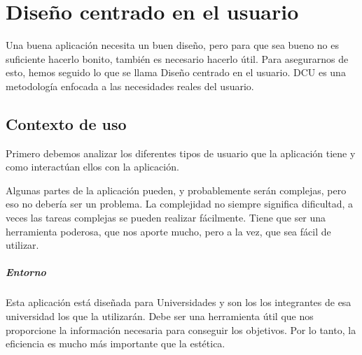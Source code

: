\section{Diseño centrado en el usuario}
Una buena aplicación necesita un buen diseño, pero para que sea bueno no es suficiente hacerlo bonito, también es necesario hacerlo útil. Para asegurarnos de esto, hemos seguido lo que se llama Diseño centrado en el usuario. DCU es una metodología enfocada a las necesidades reales del usuario.
\subsection{Contexto de uso}
Primero debemos analizar los diferentes tipos de usuario que la aplicación tiene y como interactúan ellos con la aplicación.

Algunas partes de la aplicación pueden, y probablemente serán complejas, pero eso no debería ser un problema. La complejidad no siempre significa dificultad, a veces las tareas complejas se pueden realizar fácilmente. Tiene que ser una herramienta poderosa, que nos aporte mucho, pero a la vez, que sea fácil de utilizar.
\subparagraph{Entorno}
Esta aplicación está diseñada para Universidades y son los los integrantes de esa universidad los que la utilizarán. Debe ser una herramienta útil que nos proporcione la información necesaria para conseguir los objetivos. Por lo tanto, la eficiencia es mucho más importante que la estética.
